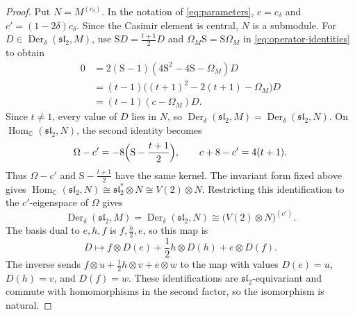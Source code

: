 \documentclass[11pt,reqno]{amsart}
\numberwithin{equation}{section}
\newcommand{\C}{\mathbb C}
\newcommand{\s}{\mathfrak{sl}_2}
\DeclareMathOperator{\Der}{Der}
\DeclareMathOperator{\Hom}{Hom}
\theoremstyle{definition}
\theoremstyle{remark}
\begin{document}
\begin{proof}
Put \(N=M^{(c_\delta)}\). In the notation of \eqref{eq:parameters},
\(c=c_\delta\) and \(c'=(1-2\delta)c_\delta\).
Since the Casimir element is central, \(N\) is a submodule.
For \(D\in\Der_\delta(\s,M)\), use
\(\mathrm{S}D=\frac{t+1}{2}D\) and
\(\Omega_M\mathrm{S}=\mathrm{S}\Omega_M\) in
\eqref{eq:operator-identities} to obtain
\[
\begin{aligned}
0
&=2(\mathrm{S}-1)(4\mathrm{S}^2-4\mathrm{S}-\Omega_M)D\\
&=(t-1)\bigl((t+1)^2-2(t+1)-\Omega_M\bigr)D\\
&=(t-1)(c-\Omega_M)D.
\end{aligned}
\]
Since \(t\ne1\), every value of \(D\) lies in \(N\), so
\(\Der_\delta(\s,M)=\Der_\delta(\s,N)\).
On \(\Hom_\C(\s,N)\), the second identity becomes
\[
\Omega-c'=-8\Bigl(\mathrm{S}-\frac{t+1}{2}\Bigr),
\qquad c+8-c'=4(t+1).
\]
Thus \(\Omega-c'\) and \(\mathrm{S}-\frac{t+1}{2}\) have the same kernel.
The invariant form fixed above gives
\(\Hom_\C(\s,N)\cong\s^*\otimes N\cong V(2)\otimes N\).
Restricting this identification to the \(c'\)-eigenspace of \(\Omega\) gives
\begin{equation}\label{eq:reduction}
\Der_\delta(\s,M)=\Der_\delta(\s,N)
\cong\bigl(V(2)\otimes N\bigr)^{(c')}.
\end{equation}
The basis dual to \(e,h,f\) is \(f,\frac{h}{2},e\), so this map is
\begin{equation}\label{eq:tensor-identification}
D\longmapsto f\otimes D(e)+\frac{1}{2}h\otimes D(h)+e\otimes D(f).
\end{equation}
The inverse sends \(f\otimes u+\frac{1}{2}h\otimes v+e\otimes w\)
to the map with values \(D(e)=u\), \(D(h)=v\), and \(D(f)=w\).
These identifications are \(\s\)-equivariant and commute with
homomorphisms in the second factor, so the isomorphism is natural.


\end{proof}
\end{document}
